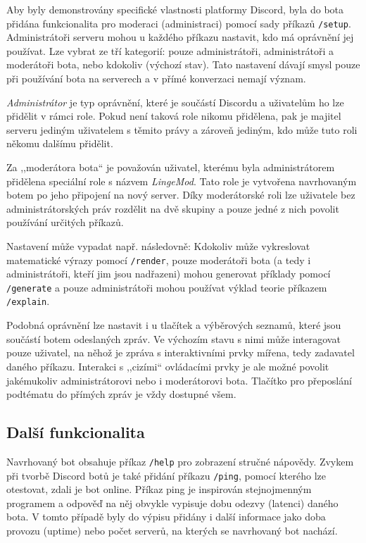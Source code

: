 \documentclass[FM]{tulthesis}
\begin{document}
	Aby byly demonstrovány specifické vlastnosti platformy Discord, byla do bota přidána funkcionalita pro moderaci (administraci) pomocí sady příkazů \verb|/setup|. Administrátoři serveru mohou u každého příkazu nastavit, kdo má oprávnění jej používat. Lze vybrat ze tří kategorií: pouze administrátoři, administrátoři a moderátoři bota, nebo kdokoliv (výchozí stav). Tato nastavení dávají smysl pouze při používání bota na serverech a v přímé konverzaci nemají význam.
	
	\textit{Administrátor} je typ oprávnění, které je součástí Discordu a uživatelům ho lze přidělit v rámci role. Pokud není taková role nikomu přidělena, pak je majitel serveru jediným uživatelem s těmito právy a zároveň jediným, kdo může tuto roli někomu dalšímu přidělit.
	
	Za ,,moderátora bota`` je považován uživatel, kterému byla administrátorem přidělena speciální role s názvem \textit{LingeMod}. Tato role je vytvořena navrhovaným botem po jeho připojení na nový server. Díky moderátorské roli lze uživatele bez administrátorských práv rozdělit na dvě skupiny a pouze jedné z nich povolit používání určitých příkazů.
	
	Nastavení může vypadat např. následovně: Kdokoliv může vykreslovat matematické výrazy pomocí \verb|/render|, pouze moderátoři bota (a tedy i administrátoři, kteří jim jsou nadřazeni) mohou generovat příklady pomocí \verb|/generate| a pouze administrátoři mohou používat výklad teorie příkazem \verb|/explain|.
	
	Podobná oprávnění lze nastavit i u tlačítek a výběrových seznamů, které jsou součástí botem odeslaných zpráv. Ve výchozím stavu s nimi může interagovat pouze uživatel, na něhož je zpráva s interaktivními prvky mířena, tedy zadavatel daného příkazu. Interakci s ,,cizími`` ovládacími prvky je ale možné povolit jakémukoliv administrátorovi nebo i moderátorovi bota. Tlačítko pro přeposlání podtématu do přímých zpráv je vždy dostupné všem.
	
	\subsection{Další funkcionalita} %
	
	Navrhovaný bot obsahuje příkaz \verb|/help| pro zobrazení stručné nápovědy. Zvykem při tvorbě Discord botů je také přidání příkazu \verb|/ping|, pomocí kterého lze otestovat, zdali je bot online. Příkaz ping je inspirován stejnojmenným programem a odpověď na něj obvykle vypisuje dobu odezvy (latenci) daného bota. V tomto případě byly do výpisu přidány i další informace jako doba provozu (uptime) nebo počet serverů, na kterých se navrhovaný bot nachází.
	
\end{document}
